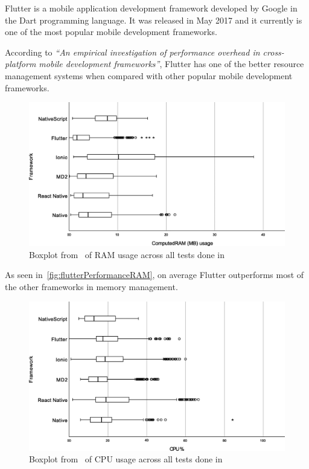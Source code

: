 \documentclass[a4paper,12pt]{report}
\begin{document}
Flutter\cite{flutterDocs} is a mobile application development framework
developed by Google in the Dart programming language. It was released in May
2017 and it currently is one of the most popular mobile development frameworks.

According to \textit{``An empirical investigation of performance overhead in
    cross-platform mobile development frameworks''}\cite{flutterPerformance},
Flutter has one of the better resource management systems when compared with
other popular mobile development frameworks.

\begin{figure}[H]
    \centering
    \includegraphics[scale=0.4]{images/flutterPerformance/ram.png}
    \caption{Boxplot from~\cite{flutterPerformance} of RAM usage across all tests done in~\cite{flutterPerformance} }\label{fig:flutterPerformanceRAM}
\end{figure}

As seen in~\autoref{fig:flutterPerformanceRAM}, on average Flutter outperforms
most of the other frameworks in memory management.

\begin{figure}[H]
    \centering
    \includegraphics[scale=0.4]{images/flutterPerformance/cpu.png}
    \caption{Boxplot from~\cite{flutterPerformance} of CPU usage across all tests done in~\cite{flutterPerformance} }\label{fig:flutterPerformanceCPU}
\end{figure}
\end{document}
